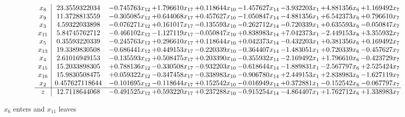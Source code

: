 \documentclass[10pt]{article}
\begin{document}
 \[\begin{array}{c| c c@{\hskip 2pt} c@{\hskip 2pt} c@{\hskip 2pt} c@{\hskip 2pt} c@{\hskip 2pt} c@{\hskip 2pt} c@{\hskip 2pt} }
 x_{8}   &  23.3559322034 & -0.745763 x_{12} & + 1.796610 x_{17} & + 0.118644 x_{10} & -1.457627 x_{14} & -3.932203 x_{1} & + 4.881356 x_{6} & + 1.169492 x_{7}\\
 x_{9}   &  11.3728813559 & -0.305085 x_{12} & + 0.644068 x_{17} & + 0.457627 x_{10} & -1.050847 x_{14} & -4.881356 x_{1} & + 6.542373 x_{6} & + 0.796610 x_{7}\\
 x_{3}   &  4.59322033898 & -0.076271 x_{12} & + 0.161017 x_{17} & -0.135593 x_{10} & -0.262712 x_{14} & -0.720339 x_{1} & + 0.635593 x_{6} & -0.050847 x_{7}\\
 x_{11}   &  5.84745762712 & -0.466102 x_{12} & -1.127119 x_{17} & -0.050847 x_{10} & + 0.838983 x_{14} & + 7.042373 x_{1} & -2.449153 x_{6} & + 3.355932 x_{7}\\
 x_{5}   &  0.35593220339 & -0.245763 x_{12} & + 0.296610 x_{17} & + 0.118644 x_{10} & + 0.042373 x_{14} & -0.432203 x_{1} & + 0.381356 x_{6} & + 0.169492 x_{7}\\
 x_{13}   &  19.3389830508 & -0.686441 x_{12} & + 0.449153 x_{17} & -0.220339 x_{10} & -0.364407 x_{14} & -1.483051 x_{1} & + 0.720339 x_{6} & -0.457627 x_{7}\\
 x_{4}   &  2.61016949153 & -0.135593 x_{12} & + 0.508475 x_{17} & + 0.203390 x_{10} & -0.355932 x_{14} & -2.169492 x_{1} & + 1.796610 x_{6} & -0.423729 x_{7}\\
 x_{15}   &  15.2033898305 & + 0.788136 x_{12} & -0.330508 x_{17} & -0.932203 x_{10} & -0.618644 x_{14} & -1.889831 x_{1} & -2.567797 x_{6} & + 2.525424 x_{7}\\
 x_{16}   &  15.9830508475 & + 0.059322 x_{12} & -0.347458 x_{17} & -0.338983 x_{10} & -0.906780 x_{14} & + 2.449153 x_{1} & + 2.838983 x_{6} & -1.627119 x_{7}\\
 x_{2}   &  0.457627118644 & -0.101695 x_{12} & -0.118644 x_{17} & + 0.152542 x_{10} & -0.016949 x_{14} & + 0.372881 x_{1} & -0.152542 x_{6} & -0.067797 x_{7}\\
\hline
z    &  12.7118644068 & -0.491525 x_{12} & + 0.593220 x_{17} & + 0.237288 x_{10} & -0.915254 x_{14} & -4.864407 x_{1} & + 1.762712 x_{6} & + 1.338983 x_{7}\\
\end{array}\]


 $ x_{6} $ enters and $ x_{11} $ leaves 
\end{document}
